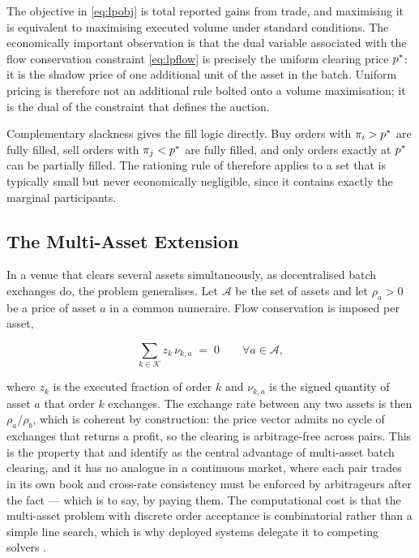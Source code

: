 The objective in \eqref{eq:lpobj} is total reported gains from trade,
and maximising it is equivalent to maximising executed volume under
standard conditions. The economically important observation is that the
dual variable associated with the flow conservation constraint
\eqref{eq:lpflow} is precisely the uniform clearing price $p^{\ast}$: it is
the shadow price of one additional unit of the asset in the batch.
Uniform pricing is therefore not an additional rule bolted onto a volume
maximisation; it is the dual of the constraint that defines the auction.

Complementary slackness gives the fill logic directly. Buy orders with
$\pi_i > p^{\ast}$ are fully filled, sell orders with $\pi_j < p^{\ast}$ are
fully filled, and only orders exactly at $p^{\ast}$ can be partially filled.
The rationing rule of  therefore applies to a set
that is typically small but never economically negligible, since it
contains exactly the marginal participants.

\subsection{The Multi-Asset Extension}

In a venue that clears several assets simultaneously, as decentralised
batch exchanges do, the problem generalises. Let $\mathcal{A}$ be the
set of assets and let $\rho_a > 0$ be a price of asset $a$ in a common
numeraire. Flow conservation is imposed per asset,

\begin{equation}
\sum_{k \in \mathcal{K}} z_k \, \nu_{k,a} \;=\; 0 \qquad \forall a \in \mathcal{A},
\label{eq:multiflow}
\end{equation}

where $z_k$ is the executed fraction of order $k$ and $\nu_{k,a}$ is the
signed quantity of asset $a$ that order $k$ exchanges. The exchange rate
between any two assets is then $\rho_a / \rho_b$, which is coherent by
construction: the price vector admits no cycle of exchanges that returns
a profit, so the clearing is arbitrage-free across pairs. This is the
property that \citet{walther2021multitoken} and \citet{ramsay2023speedex}
identify as the central advantage of multi-asset batch clearing, and it
has no analogue in a continuous market, where each pair trades in its
own book and cross-rate consistency must be enforced by arbitrageurs
after the fact --- which is to say, by paying them. The computational
cost is that the multi-asset problem with discrete order acceptance is
combinatorial rather than a simple line search, which is why deployed
systems delegate it to competing solvers
\citep{harrison2025hybrid,canidio2026fair}.

